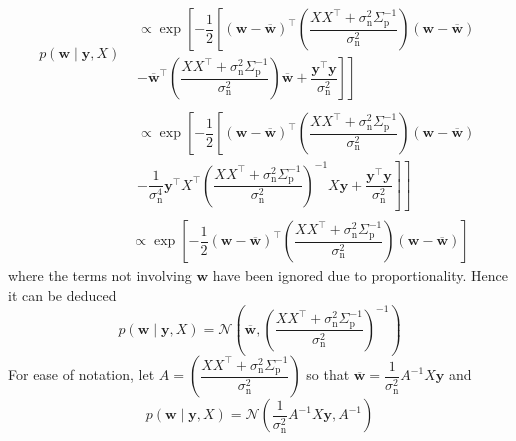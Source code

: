 \documentclass[11pt]{report} %
\begin{document}
\begin{align}
p\left(\mathbf{w}\middle|\mathbf{y},X\right) &\begin{multlined}\propto\exp\left[-\dfrac{1}{2}\left[\left(\mathbf{w}-\overline{\mathbf{w}}\right)^{\top}\left(\dfrac{XX^{\top}+\sigma_{\mathrm{n}}^{2}\Sigma_{\mathrm{p}}^{-1}}{\sigma_{\mathrm{n}}^{2}}\right)\left(\mathbf{w}-\overline{\mathbf{w}}\right) \right.\right. \\
\left.\left. -\overline{\mathbf{w}}^{\top}\left(\dfrac{XX^{\top}+\sigma_{\mathrm{n}}^{2}\Sigma_{\mathrm{p}}^{-1}}{\sigma_{\mathrm{n}}^{2}}\right)\overline{\mathbf{w}}+\dfrac{\mathbf{y}^{\top}\mathbf{y}}{\sigma_{\mathrm{n}}^{2}}\right]\right]
\end{multlined} \\
&\begin{multlined} \propto\exp\left[-\dfrac{1}{2}\left[\left(\mathbf{w}-\overline{\mathbf{w}}\right)^{\top}\left(\dfrac{XX^{\top}+\sigma_{\mathrm{n}}^{2}\Sigma_{\mathrm{p}}^{-1}}{\sigma_{\mathrm{n}}^{2}}\right)\left(\mathbf{w}-\overline{\mathbf{w}}\right) \right.\right. \\
\left.\left. -\dfrac{1}{\sigma_{\mathrm{n}}^{4}}\mathbf{y}^{\top}X^{\top}\left(\dfrac{XX^{\top}+\sigma_{\mathrm{n}}^{2}\Sigma_{\mathrm{p}}^{-1}}{\sigma_{\mathrm{n}}^{2}}\right)^{-1}X\mathbf{y}+\dfrac{\mathbf{y}^{\top}\mathbf{y}}{\sigma_{\mathrm{n}}^{2}}\right]\right]
\end{multlined} \\
&\propto\exp\left[-\dfrac{1}{2}\left(\mathbf{w}-\overline{\mathbf{w}}\right)^{\top}\left(\dfrac{XX^{\top}+\sigma_{\mathrm{n}}^{2}\Sigma_{\mathrm{p}}^{-1}}{\sigma_{\mathrm{n}}^{2}}\right)\left(\mathbf{w}-\overline{\mathbf{w}}\right)\right]
\end{align}
where the terms not involving $\mathbf{w}$ have been ignored due to proportionality. Hence it can be deduced
\begin{equation}
p\left(\mathbf{w}\middle|\mathbf{y},X\right)=\mathcal{N}\left(\overline{\mathbf{w}},\left(\dfrac{XX^{\top}+\sigma_{\mathrm{n}}^{2}\Sigma_{\mathrm{p}}^{-1}}{\sigma_{\mathrm{n}}^{2}}\right)^{-1}\right)
\end{equation}
For ease of notation, let $A=\left(\dfrac{XX^{\top}+\sigma_{\mathrm{n}}^{2}\Sigma_{\mathrm{p}}^{-1}}{\sigma_{\mathrm{n}}^{2}}\right)$ so that $\overline{\mathbf{w}}=\dfrac{1}{\sigma_{\mathrm{n}}^{2}}A^{-1}X\mathbf{y}$ and
\begin{equation}
p\left(\mathbf{w}\middle|\mathbf{y},X\right)=\mathcal{N}\left(\dfrac{1}{\sigma_{\mathrm{n}}^{2}}A^{-1}X\mathbf{y},A^{-1}\right)
\end{equation}
\end{document}
